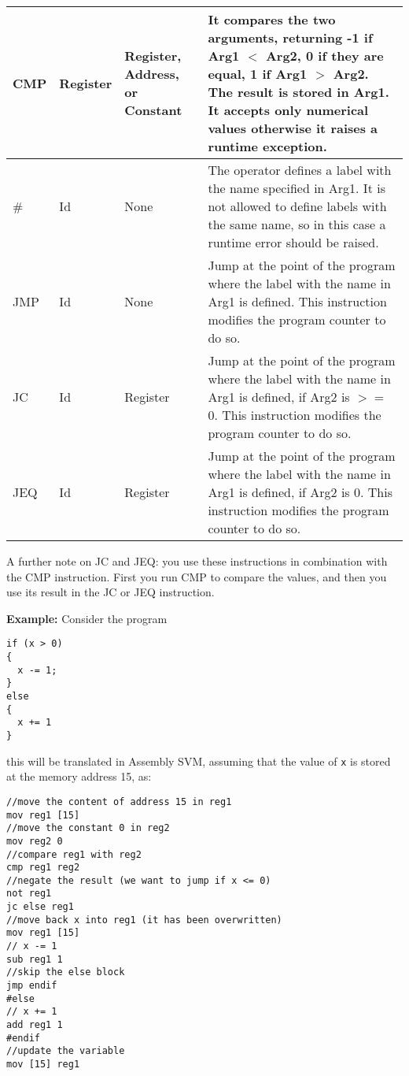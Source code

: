 \begin{longtable}{|p{1cm}|p{2cm}|p{2cm}|p{5cm}|}
	\hline
	CMP & Register & Register, Address, or Constant & It compares the two arguments, returning -1 if Arg1 $<$ Arg2, 0 if they are equal, 1 if Arg1 $>$ Arg2. The result is stored in Arg1. It accepts only numerical values otherwise it raises a runtime exception. \\
	\hline
	\# & Id & None & The operator defines a label with the name specified in Arg1. It is not allowed to define labels with the same name, so in this case a runtime error should be raised. \\
	\hline
	JMP & Id & None & Jump at the point of the program where the label with the name in Arg1 is defined. This instruction modifies the program counter to do so. \\
	\hline
	JC & Id & Register & Jump at the point of the program where the label with the name in Arg1 is defined, if Arg2 is $>=$ 0. This instruction modifies the program counter to do so. \\
	\hline
	JEQ & Id & Register & Jump at the point of the program where the label with the name in Arg1 is defined, if Arg2 is 0. This instruction modifies the program counter to do so. \\
	\hline
\end{longtable}

\noindent
A further note on JC and JEQ: you use these instructions in combination with the CMP instruction. First you run CMP to compare the values, and then you use its result in the JC or JEQ instruction.

\vspace{0.5cm}
\noindent
\textbf{Example:} Consider the program

\begin{lstlisting}
if (x > 0)
{
  x -= 1;
}
else
{
  x += 1
}
\end{lstlisting}

\noindent
this will be translated in Assembly SVM, assuming that the value of \texttt{x} is stored at the memory address 15, as:

\begin{lstlisting}
//move the content of address 15 in reg1
mov reg1 [15]
//move the constant 0 in reg2
mov reg2 0 
//compare reg1 with reg2
cmp reg1 reg2
//negate the result (we want to jump if x <= 0)
not reg1
jc else reg1
//move back x into reg1 (it has been overwritten)
mov reg1 [15]
// x -= 1
sub reg1 1
//skip the else block 
jmp endif
#else
// x += 1
add reg1 1
#endif
//update the variable
mov [15] reg1
\end{lstlisting}